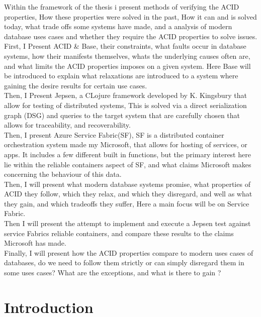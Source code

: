 \documentclass[a4paper,10pt,titlepage]{report}
\begin{document}
Within the framework of the thesis i present methods of verifying the ACID properties, How these properties were solved in the past, How it can and is solved today, what trade offs some systems have made, and a analysis of modern database uses cases and whether they require the ACID properties to solve issues.\\
\vspace{5mm}
First, I Present ACID \& Base, their constraints, what faults occur in database systems, how their manifests themselves, whats the underlying causes often are, and what limits the ACID properties imposes on a given system. Here Base will be introduced to explain what relaxations are introduced to a system where gaining the desire results for certain use cases. \\

Then, I Present Jepsen, a CLojure framework\cite{jepsonio} developed by K. Kingsbury that allow for testing of distributed systems, This is solved via a direct serialization graph (DSG) and queries to the target system that are carefully chosen that allows for traceability, and recoverability.  \\


Then, I present Azure Service Fabric(SF), SF is a distributed container orchestration system made my Microsoft, that allows for hosting of services, or apps. It includes a few different built in functions, but the primary interest here lie within the reliable containers aspect of SF, and what claims Microsoft makes concerning the behaviour of this data.\\

Then, I will present what modern database systems promise, what properties of ACID they follow, which they relax, and which they disregard, and well as what they gain, and which tradeoffs they suffer, Here a main focus will be on Service Fabric.\\

Then I will present the attempt to implement and execute a Jepsen test against service Fabrics reliable containers, and compare these results to the claims Microsoft has made.\\

Finally, I will present how the ACID properties compare to modern uses cases of databases, do we need to follow them strictly or can simply disregard them in some uses cases? What are the exceptions, and what is there to gain ?\\


\chapter{Introduction}
\end{document}
